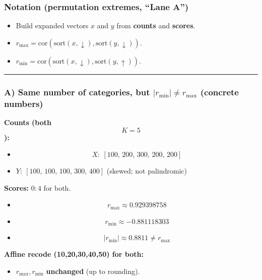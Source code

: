 \documentclass[
  letterpaper,
  DIV=11,
  numbers=noendperiod]{scrartcl}
\providecommand{\tightlist}{%
  \setlength{\itemsep}{0pt}\setlength{\parskip}{0pt}}
\theoremstyle{remark}
\begin{document}
\subsubsection{Notation (permutation extremes, ``Lane
A'')}\label{notation-permutation-extremes-lane-a}

\begin{itemize}
\item
  Build expanded vectors \(x\) and \(y\) from \textbf{counts} and
  \textbf{scores}.
\item
  \(r_{\max}=\mathrm{cor}(\text{sort}(x,\downarrow),\text{sort}(y,\downarrow))\).
\item
  \(r_{\min}=\mathrm{cor}(\text{sort}(x,\downarrow),\text{sort}(y,\uparrow))\).
\end{itemize}

\begin{center}\rule{0.5\linewidth}{0.5pt}\end{center}

\subsubsection{\texorpdfstring{A) \textbf{Same number of categories, but
\(|r_{\min}|\ne r_{\max}\)} (concrete
numbers)}{A) Same number of categories, but \textbar r\_\{\textbackslash min\}\textbar\textbackslash ne r\_\{\textbackslash max\} (concrete numbers)}}\label{a-same-number-of-categories-but-r_minne-r_max-concrete-numbers}

\textbf{Counts (both \[K=5\]):}

\begin{itemize}
\item
  \[X:\ [100,\,200,\,300,\,200,\,200]\]
\item
  \(Y:\ [100,\,100,\,100,\,300,\,400]\) (skewed; not palindromic)
\end{itemize}

\textbf{Scores:} \(0{:}4\) for both.

\begin{itemize}
\item
  \[r_{\max}\approx 0.929398758\]
\item
  \[r_{\min}\approx -0.881118303\]
\item
  \[|r_{\min}| \approx 0.8811 \ne r_{\max}\]
\end{itemize}

\textbf{Affine recode (10,20,30,40,50) for both:}

\begin{itemize}
\tightlist
\item
  \(r_{\max}, r_{\min}\) \textbf{unchanged} (up to rounding).
\end{itemize}
\end{document}
